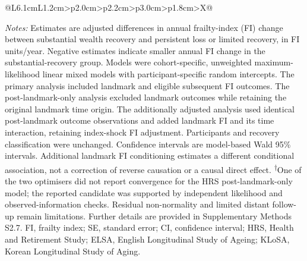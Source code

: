 \begin{landscape}
\begin{tabularx}{\linewidth}{@{}L{6.1cm}L{1.2cm}>{\centering\arraybackslash}p{2.0cm}>{\centering\arraybackslash}p{2.2cm}>{\centering\arraybackslash}p{3.0cm}>{\centering\arraybackslash}p{1.8cm}>{\centering\arraybackslash}X@{}}
\bottomrule
\end{tabularx}
\vspace{5pt}
\parbox{\linewidth}{\raggedright\fontsize{9}{11}\selectfont\textit{Notes:} Estimates are adjusted differences in annual frailty-index (FI) change between substantial wealth recovery and persistent loss or limited recovery, in FI units/year. Negative estimates indicate smaller annual FI change in the substantial-recovery group. Models were cohort-specific, unweighted maximum-likelihood linear mixed models with participant-specific random intercepts. The primary analysis included landmark and eligible subsequent FI outcomes. The post-landmark-only analysis excluded landmark outcomes while retaining the original landmark time origin. The additionally adjusted analysis used identical post-landmark outcome observations and added landmark FI and its time interaction, retaining index-shock FI adjustment. Participants and recovery classification were unchanged. Confidence intervals are model-based Wald 95\% intervals. Additional landmark FI conditioning estimates a different conditional association, not a correction of reverse causation or a causal direct effect. \textsuperscript{\ensuremath{\dagger}}One of the two optimisers did not report convergence for the HRS post-landmark-only model; the reported candidate was supported by independent likelihood and observed-information checks. Residual non-normality and limited distant follow-up remain limitations. Further details are provided in Supplementary Methods S2.7. FI, frailty index; SE, standard error; CI, confidence interval; HRS, Health and Retirement Study; ELSA, English Longitudinal Study of Ageing; KLoSA, Korean Longitudinal Study of Aging.}
\endgroup
\end{landscape}
